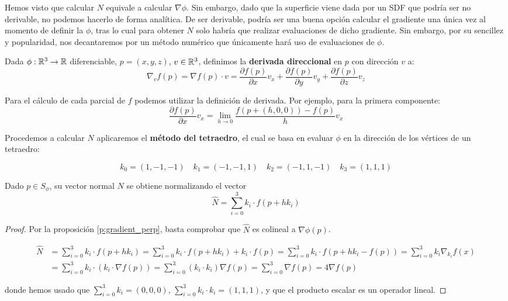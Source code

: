 Hemos visto que calcular $N$ equivale a calcular $\nabla\phi$. Sin embargo, dado que la superficie viene dada por un SDF que podría ser no derivable, no podemos hacerlo de forma analítica. De ser derivable, podría ser una buena opción calcular el gradiente una única vez al momento de definir la $\phi$, tras lo cual para obtener $N$ solo habría que realizar evaluaciones de dicho gradiente. Sin embargo, por su sencillez y popularidad, nos decantaremos por un método numérico que únicamente hará uso de evaluaciones de $\phi$.

\begin{definicion}
  Dada $\phi:\mathbb{R}^3\to \mathbb{R}$ diferenciable, $p = (x,y,z)$, $v\in \mathbb{R}^3$, definimos la \textbf{derivada direccional} en $p$ con dirección $v$ a:
  \begin{equation*}
    \nabla_v f(p) = \nabla f(p) \cdot v = \frac{\partial{f}(p)}{\partial{x}}v_x + \frac{\partial{f}(p)}{\partial{y}}v_y + \frac{\partial{f}(p)}{\partial{z}}v_z
  \end{equation*}
\end{definicion}

Para el cálculo de cada parcial de $f$ podemos utilizar la definición de derivada. Por ejemplo, para la primera componente:
\begin{equation*}
  \frac{\partial{f}(p)}{\partial{x}} v_x = \lim_{h\to 0}\frac{f(p + (h,0,0)) - f(p)}{h} v_x
\end{equation*}

Procedemos a calcular $N$ aplicaremos el \textbf{método del tetraedro}, el cual se basa en evaluar $\phi$ en la dirección de los vértices de un tetraedro:

\begin{equation*}
    k_0 = (1,-1,-1)\quad k_1 = (-1,-1,1)\quad k_2=(-1,1,-1)\quad k_3=(1,1,1)
\end{equation*}

\begin{proposicion}
  Dado $p\in S_\phi$, su vector normal $N$ se obtiene normalizando el vector
  \begin{equation*}
    \hat{N} = \sum_{i=0}^3 k_i\cdot f(p + hk_i)
  \end{equation*}
\end{proposicion}

\begin{proof}
  Por la proposición \autoref{p:gradient_perp}, basta comprobar que $\hat{N}$ es colineal a $\nabla \phi(p)$.

  \begin{align*}
    \hat{N} & = \sum_{i=0}^3 k_i\cdot f(p + hk_i) = \sum_{i=0}^3 k_i\cdot f(p + hk_i) + k_i\cdot f(p) = \sum_{i=0}^3 k_i\cdot f(p+hk_i - f(p)) = \sum_{i=0}^3 k_i \nabla_{k_i}f(x)\\
    &= \sum_{i=0}^3 k_i \cdot \left( k_i \cdot \nabla f(p)\right) = \sum_{i=0}^3 (k_i\cdot k_i) \nabla f(p) = \sum_{i=0}^3 \nabla f(p) = 4\nabla f(p)
  \end{align*}

  donde hemos usado que $\sum_{i=0}^3 k_i = (0,0,0)$, $\sum_{i=0}^3 k_i\cdot k_i = (1,1,1)$, y que el producto escalar es un operador lineal.
\end{proof}

